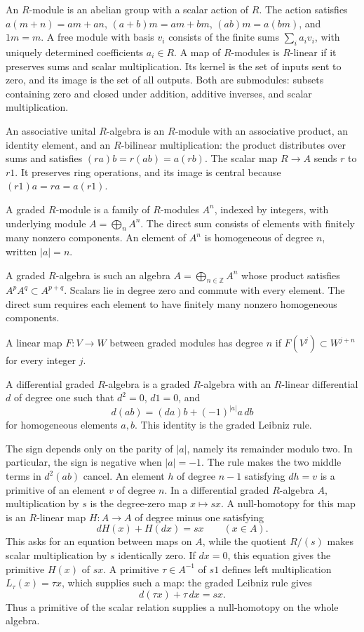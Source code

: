 An $R$-module is an abelian group with a scalar action of $R$.
The action satisfies $a(m+n)=am+an$, $(a+b)m=am+bm$,
$(ab)m=a(bm)$, and $1m=m$.
A free module with basis $v_i$ consists of the finite sums $\sum_i a_i v_i$,
with uniquely determined coefficients $a_i\in R$.
A map of $R$-modules is $R$-linear if it preserves sums and scalar
multiplication.
Its kernel is the set of inputs sent to zero, and its image is the set of
all outputs. Both are submodules: subsets containing zero and closed under
addition, additive inverses, and scalar multiplication.

An associative unital $R$-algebra is an $R$-module with an associative
product, an identity element, and an $R$-bilinear multiplication:
the product distributes over sums and satisfies $(ra)b=r(ab)=a(rb)$.
The scalar map $R\to A$ sends $r$ to $r1$.
It preserves ring operations, and its image is central because
$(r1)a=ra=a(r1)$.

A graded $R$-module is a family of $R$-modules $A^n$, indexed by
integers, with underlying module $A=\bigoplus_n A^n$.
The direct sum consists of elements with finitely many nonzero components.
An element of $A^n$ is homogeneous of degree $n$, written $|a|=n$.

A graded $R$-algebra is such an algebra
$A=\bigoplus_{n\in\mathbb Z}A^n$ whose product satisfies
$A^p A^q\subset A^{p+q}$. Scalars lie in degree zero and commute with
every element. The direct sum requires each element to have finitely many
nonzero homogeneous components.

A linear map $F:V\to W$ between graded modules has degree $n$ if
$F(V^j)\subset W^{j+n}$ for every integer $j$.
\begin{definition}\label{def:rel-dga}
A differential graded $R$-algebra is a graded $R$-algebra with an
$R$-linear differential $d$ of degree one such that $d^2=0$, $d1=0$, and
\begin{equation}\label{eq:rel-leibniz}
 d(ab)=(da)b+(-1)^{|a|}a\,db
\end{equation}
for homogeneous elements $a,b$. This identity is the graded Leibniz rule.
\end{definition}


The sign depends only on the parity of $|a|$, namely its remainder modulo
two. In particular, the sign is negative when $|a|=-1$.
The rule makes the two middle terms in $d^2(ab)$ cancel.
An element $h$ of degree $n-1$ satisfying $dh=v$ is a primitive of
an element $v$ of degree $n$.
In a differential graded $R$-algebra $A$, multiplication by $s$ is
the degree-zero map $x\mapsto sx$.
A null-homotopy for this map is an $R$-linear map $H:A\to A$ of
degree minus one satisfying
\[
 dH(x)+H(dx)=sx\qquad(x\in A).
\]
This asks for an equation between maps on $A$, while the quotient
$R/(s)$ makes scalar multiplication by $s$ identically zero.
If $dx=0$, this equation gives the primitive $H(x)$ of $sx$.
A primitive $\tau\in A^{-1}$ of $s1$ defines left multiplication
$L_\tau(x)=\tau x$, which supplies such a map:
the graded Leibniz rule gives
\[
 d(\tau x)+\tau\,dx=sx.
\]
Thus a primitive of the scalar relation supplies a null-homotopy
on the whole algebra.


